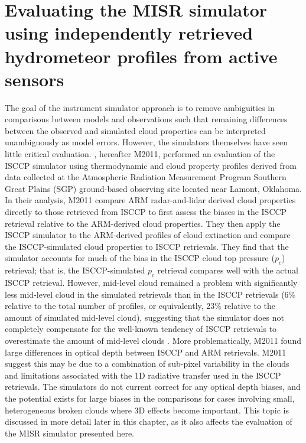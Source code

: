 \chapter{Evaluating the MISR simulator using independently retrieved hydrometeor profiles from active sensors}\label{misr_chapter}

The goal of the instrument simulator approach is to remove ambiguities in comparisons between models and observations such that remaining differences between the observed and simulated cloud properties can be interpreted unambiguously as model errors. However, the simulators themselves have seen little critical evaluation. \cite{mace_et_al_2011}, hereafter M2011, performed an evaluation of the ISCCP simulator using thermodynamic and cloud property profiles derived from data collected at the Atmospheric Radiation Measurement Program \citep[ARM;][]{ackerman_and_stokes_2003} Southern Great Plains (SGP) ground-based observing site located near Lamont, Oklahoma. In their analysis, M2011 compare ARM radar-and-lidar derived cloud properties directly to those retrieved from ISCCP to first assess the biases in the ISCCP retrieval relative to the ARM-derived cloud properties. They then apply the ISCCP simulator to the ARM-derived profiles of cloud extinction and compare the ISCCP-simulated cloud properties to ISCCP retrievals. They find that the simulator accounts for much of the bias in the ISCCP cloud top pressure ($p_c$) retrieval; that is, the ISCCP-simulated $p_c$ retrieval compares well with the actual ISCCP retrieval. However, mid-level cloud remained a problem with significantly less mid-level cloud in the simulated retrievals than in the ISCCP retrievals (6\% relative to the total number of profiles, or equivalently, 23\% relative to the amount of simulated mid-level cloud), suggesting that the simulator does not completely compensate for the well-known tendency of ISCCP retrievals to overestimate the amount of mid-level clouds \citep[e.g.,]{marchand_et_al_2010}. More problematically, M2011 found large differences in optical depth between ISCCP and ARM retrievals. M2011 suggest this may be due to a combination of sub-pixel variability in the clouds and limitations associated with the 1D radiative transfer used in the ISCCP retrievals. The simulators do not current correct for any optical depth biases, and the potential exists for large biases in the comparisons for cases involving small, heterogeneous broken clouds where 3D effects become important. This topic is discussed in more detail later in this chapter, as it also affects the evaluation of the MISR simulator presented here.

